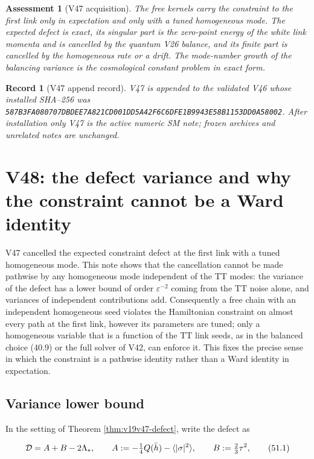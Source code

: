 \documentclass[11pt]{article}
\newtheorem{assessment}[theorem]{Assessment}
\newtheorem{record}[theorem]{Record}
\theoremstyle{remark}
\begin{document}
\begin{assessment}[V47 acquisition]
\label{ass:v19v47}
The free kernels carry the constraint to the first link only in
expectation and only with a tuned homogeneous mode.  The expected
defect is exact, its singular part is the zero-point energy of the
white link momenta and is cancelled by the quantum V26 balance, and
its finite part is cancelled by the homogeneous rate or a drift.  The
mode-number growth of the balancing variance is the cosmological
constant problem in exact form.
\end{assessment}

\begin{record}[V47 append record]
\label{rec:v19v47}
V47 is appended to the validated V46 whose installed SHA--256 was
\texttt{587B3FA080707DBDEE7A821CD001DD5A42F6C6DFE1B9943E58B1153DD0A58002}.
After installation only V47 is the active numeric SM note; frozen
archives and unrelated notes are unchanged.
\end{record}


\section{V48: the defect variance and why the constraint cannot be a Ward identity}
\label{sec:v19v48}

V47 cancelled the expected constraint defect at the first link with a
tuned homogeneous mode.  This note shows that the cancellation cannot be
made pathwise by any homogeneous mode independent of the TT modes: the
variance of the defect has a lower bound of order \(\varepsilon^{-2}\)
coming from the TT noise alone, and variances of independent
contributions add.  Consequently a free chain with an independent
homogeneous seed violates the Hamiltonian constraint on almost every
path at the first link, however its parameters are tuned; only a
homogeneous variable that is a function of the TT link seeds, as in
the balanced choice (40.9) or the full solver of V42, can enforce it.
This fixes the precise sense in which the constraint is a pathwise
identity rather than a Ward identity in expectation.

\subsection{Variance lower bound}

In the setting of Theorem \ref{thm:v19v47-defect}, write the defect as

\[
 {\cal D}=A+B-2\Lambda_*,\qquad
 A:=-\tfrac14Q(\bar h)-\langle|\sigma|^2\rangle,\qquad
 B:=\tfrac23\tau^2,                                                    \tag{51.1}
\]
\end{document}
